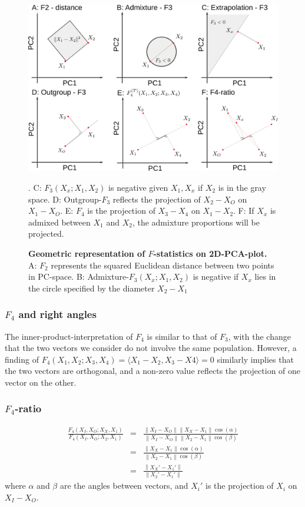 \documentclass[12pt,a4pape, fullpage]{article}
\newcommand{\norm}[1]{\left\lVert#1\right\rVert}
\begin{document}
\begin{figure}[!ht]
	\includegraphics[width=\textwidth]{dummy_pca.png}
	\caption{\textbf{Geometric representation of $F$-statistics on 2D-PCA-plot.} A: $F_2$ represents the squared Euclidean distance between two points in PC-space. B: Admixture-$F_3(X_x; X_1, X_2)$ is negative if $X_x$ lies in the circle specified by the diameter $X_2-X_1$}. C: $F_3(X_x; X_1, X_2)$ is negative given $X_1, X_x$ if $X_2$ is in the gray space.  D: Outgroup-$F_3$ reflects the projection of $X_2 - X_O$ on $X_1 - X_O$. E: $F_4$ is the projection of $X_3 - X_4$ on $X_1-X_2$. F: If $X_x$ is admixed between $X_1$ and $X_2$, the admixture proportions will be projected.
\end{figure}

\subsubsection{$F_4$ and right angles}
The inner-product-interpretation of $F_4$ is similar to that of $F_3$, with the change that the two vectors we consider do not involve the same population. However, a finding of $F_4(X_1, X_2; X_3, X_4) = \langle X_1 - X_2, X_3 - X4 \rangle = 0$ similarly implies that the two vectors are orthogonal, and a non-zero value reflects the projection of one vector on the other.

\subsubsection{$F_4$-ratio}
\begin{eqnarray}
\frac{F_4(X_I, X_O; X_X, X_1)}{F_4(X_I, X_O; X_2, X_1)} &=& \frac{\norm{X_I-X_O}\norm{X_X-X_1}\cos(\alpha)}{\norm{X_I-X_O}\norm{X_2-X_1}\cos(\beta)}\nonumber\\
&=&\frac{\norm{X_X-X_1}\cos(\alpha)}{\norm{X_2-X_1}\cos(\beta)}\nonumber\\
&=& \frac{\norm{X_X' - X_1'}}{\norm{X_2' - X_1'}}
\end{eqnarray}
where $\alpha$ and $\beta$ are the angles between vectors, and $X_i'$ is the projection of $X_i$ on $X_I-X_O$.
\end{document}
